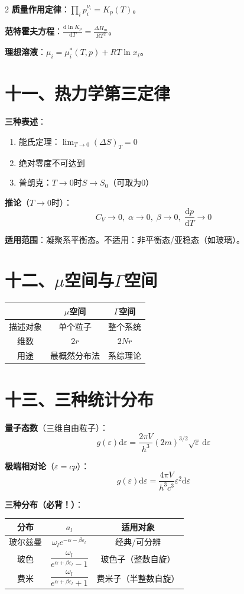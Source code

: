 \documentclass[10pt,a4paper,fontset=mac]{ctexart}
\newcommand{\dd}{\mathrm{d}}
\newcommand{\đ}{\mathrm{đ}}
\begin{document}
\begin{multicols}{2}
\textbf{质量作用定律}：$\prod_i p_i^{\nu_i}=K_p(T)$。

\textbf{范特霍夫方程}：$\frac{\dd\ln K_p}{\dd T}=\frac{\Delta H_m}{RT^2}$。

\textbf{理想溶液}：$\mu_i=\mu_i^*(T,p)+RT\ln x_i$。

\section*{十一、热力学第三定律}

\textbf{三种表述}：
\begin{enumerate}
\item 能氏定理：$\lim_{T\to0}(\Delta S)_T=0$
\item 绝对零度不可达到
\item 普朗克：$T\to0$时$S\to S_0$（可取为0）
\end{enumerate}

\textbf{推论}（$T\to0$时）：
\[
C_V\to0,\;\alpha\to0,\;\beta\to0,\;\frac{\dd p}{\dd T}\to0
\]

\textbf{适用范围}：凝聚系平衡态。不适用：非平衡态/亚稳态（如玻璃）。

\section*{十二、$\mu$空间与$\Gamma$空间}

\begin{tabular}{c|c|c}
 & $\mu$空间 & $\Gamma$空间 \\
\hline
描述对象 & 单个粒子 & 整个系统 \\
维数 & $2r$ & $2Nr$ \\
用途 & 最概然分布法 & 系综理论 \\
\end{tabular}

\section*{十三、三种统计分布}

\textbf{量子态数}（三维自由粒子）：
\[
\boxed{g(\varepsilon)\dd\varepsilon=\frac{2\pi V}{h^3}(2m)^{3/2}\sqrt{\varepsilon}\,\dd\varepsilon}
\]

\textbf{极端相对论}（$\varepsilon=cp$）：
\[
g(\varepsilon)\dd\varepsilon=\frac{4\pi V}{h^3c^3}\varepsilon^2\dd\varepsilon
\]

\textbf{三种分布（必背！）}：

\begin{tabular}{c|c|c}
分布 & $a_l$ & 适用对象 \\
\hline
玻尔兹曼 & $\omega_l e^{-\alpha-\beta\varepsilon_l}$ & 经典/可分辨 \\
玻色 & $\dfrac{\omega_l}{e^{\alpha+\beta\varepsilon_l}-1}$ & 玻色子（整数自旋） \\
费米 & $\dfrac{\omega_l}{e^{\alpha+\beta\varepsilon_l}+1}$ & 费米子（半整数自旋） \\
\end{tabular}


\end{multicols}
\end{document}
